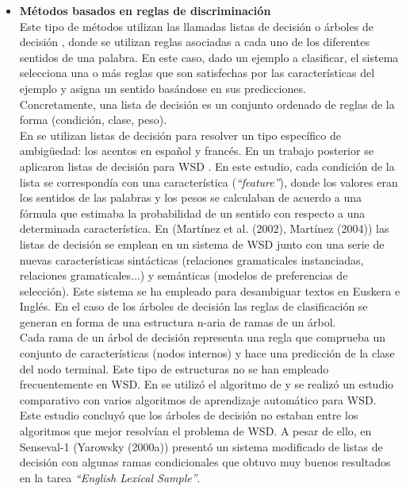 \begin{itemize}
  \item \textbf{Métodos basados en reglas de discriminación} \\
  Este tipo de métodos utilizan las llamadas listas de decisión \cite{027} o árboles de decisión \cite{028}, \cite{029} donde se utilizan reglas asociadas a cada uno de los diferentes sentidos de una palabra. En este caso, dado un ejemplo a clasificar, el sistema selecciona una o más reglas que son satisfechas por las características del ejemplo y asigna un sentido basándose en sus predicciones.\\
  Concretamente, una lista de decisión es un conjunto ordenado de reglas de la forma (condición, clase, peso).\\
  En \cite{030} se utilizan listas de decisión para resolver un tipo específico de ambigüedad: los acentos en español y francés. En un trabajo posterior se aplicaron listas de decisión para WSD \cite{031}. En este estudio, cada condición de la lista se correspondía con una característica (\textit{“feature”}), donde los valores eran los sentidos de las palabras y los pesos se calculaban de acuerdo a una fórmula que estimaba la probabilidad de un sentido con respecto a una determinada característica. En (Martínez et al. (2002), Martínez (2004)) las listas de decisión se emplean en un sistema de WSD junto con una serie de nuevas características sintácticas (relaciones gramaticales instanciadas, relaciones gramaticales...) y semánticas (modelos de preferencias de selección). Este sistema se ha empleado para desambiguar textos en Euskera e Inglés. En el caso de los árboles de decisión las reglas de clasificación se generan en forma de una estructura n-aria de ramas de un árbol. \\
  Cada rama de un árbol de decisión representa una regla que comprueba un conjunto de características (nodos internos) y hace una predicción de la clase del nodo terminal. Este tipo de estructuras no se han empleado frecuentemente en WSD. En \cite{025} se utilizó el algoritmo de \cite{029} y se realizó un estudio comparativo con varios algoritmos de aprendizaje automático para WSD. Este estudio concluyó que los árboles de decisión no estaban entre los algoritmos que mejor resolvían el problema de WSD. A pesar de ello, en Senseval-1 (Yarowsky (2000a)) presentó un sistema modificado de listas de decisión con algunas ramas condicionales que obtuvo muy buenos resultados en la tarea \textit{“English Lexical Sample”}.


\end{itemize}
